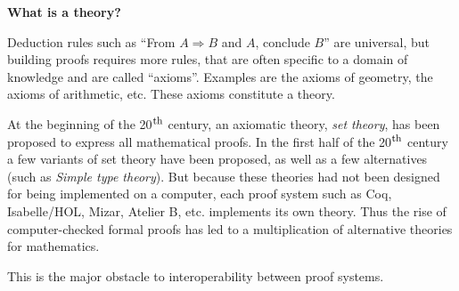\begin{framed}
\vspace*{-0.5cm}
  \begin{center}
{\bf \Large What is a theory?}
\end{center}

Deduction rules such as ``From $A \Rightarrow B$ and $A$, conclude
$B$'' are universal, but building proofs requires more rules, that are
often specific to a domain of knowledge and are called
``axioms''. Examples are the axioms of geometry, the axioms of
arithmetic, etc. These axioms constitute a theory.

At the beginning of the 20$^{\mbox{\footnotesize th}}$ century, an
axiomatic theory, {\em set theory}, has been proposed to express all
mathematical proofs. In the first half of the 20$^{\mbox{\footnotesize
    th}}$ century a few variants of set theory have been proposed, as
well as a few alternatives (such as \emph{Simple type theory}).  But
because these theories had not been designed for being implemented on
a computer, each proof system such as Coq, Isabelle/HOL, Mizar,
Atelier B, etc. implements its own theory.  Thus the rise of
computer-checked formal proofs has led to a multiplication of
alternative theories for mathematics.

This is the major obstacle to interoperability between proof systems.
\end{framed}
\pagebreak

